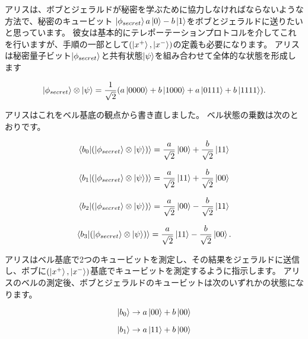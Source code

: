 アリスは、ボブとジェラルドが秘密を学ぶために協力しなければならないような方法で、秘密のキュービット
$\ket{\phi_{secret}} a\ket{0}  -b\ket{1}$をボブとジェラルドに送りたいと思っています。
彼女は基本的にテレポーテーションプロトコルを介してこれを行いますが、手順の一部として$(\ket{x^+}, \ket{x^-})$の定義も必要になります。 アリスは秘密量子ビット$\ket{\phi_{secret}} $と共有状態$\ket{\psi}$を組み合わせて全体的な状態を形成します

\begin{equation}
\label{211}
\ket{\phi_{secret}} \otimes \ket{\psi} = \frac{1}{\sqrt{2}}(a \ket{0000} + b\ket{1000} + a\ket{0111}+ b\ket{1111}).
\end{equation}

アリスはこれをベル基底の観点から書き直しました。 ベル状態の乗数は次のとおりです。

\begin{equation}
\label{212}
\braket{b_0 | (\ket{\phi_{secret}} \otimes \ket{\psi} )}
= 
\frac{a}{\sqrt{2}} \ket{00} + \frac{b}{\sqrt{2}} \ket{11}
\end{equation}

\begin{equation}
\label{213}
\braket{b_1 | (\ket{\phi_{secret}} \otimes \ket{\psi} )}
= 
\frac{a}{\sqrt{2}} \ket{11} + \frac{b}{\sqrt{2}} \ket{00}
\end{equation}

\begin{equation}
\label{214}
\braket{b_2 | (\ket{\phi_{secret}} \otimes \ket{\psi} )}
= 
\frac{a}{\sqrt{2}} \ket{00} - \frac{b}{\sqrt{2}} \ket{11}
\end{equation}

\begin{equation}
\label{215}
\braket{b_3 | (\ket{\phi_{secret}} \otimes \ket{\psi} )}
= 
\frac{a}{\sqrt{2}} \ket{11} - \frac{b}{\sqrt{2}} \ket{00}.
\end{equation}

アリスはベル基底で2つのキュービットを測定し、その結果をジェラルドに送信し、ボブに$(\ket{x^+}, \ket{x^-})$基底でキュービットを測定するように指示します。 アリスのベルの測定後、ボブとジェラルドのキュービットは次のいずれかの状態になります。

\begin{equation}
\label{216}
\ket{b_0}
\to
a \ket{00} + b \ket{00}
\end{equation}

\begin{equation}
\label{217}
\ket{b_1}
\to
a \ket{11} + b \ket{00}
\end{equation}

